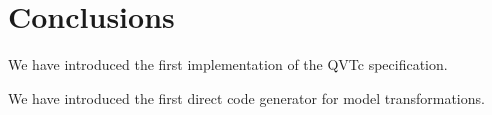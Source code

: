 \documentclass{llncs}
\begin{document}









\section{Conclusions}\label{Conclusions}

We have introduced the first implementation of the QVTc specification.

We have introduced the first direct code generator for model transformations.
\end{document}
